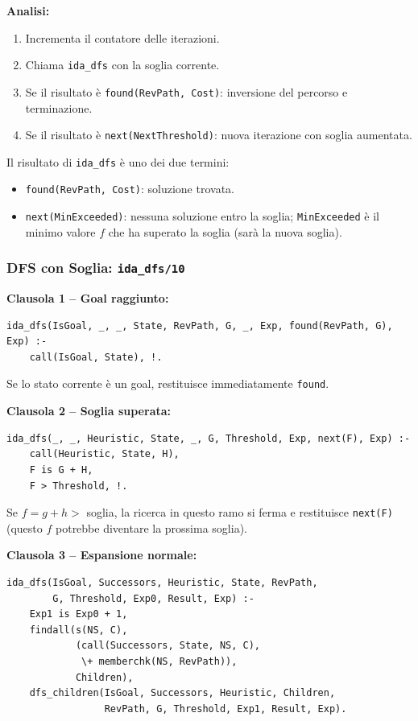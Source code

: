 \documentclass[12pt,a4paper]{article}
\begin{document}
\noindent\textbf{Analisi:}
\begin{enumerate}
  \item Incrementa il contatore delle iterazioni.
  \item Chiama \texttt{ida\_dfs} con la soglia corrente.
  \item Se il risultato è \texttt{found(RevPath, Cost)}: inversione del percorso e terminazione.
  \item Se il risultato è \texttt{next(NextThreshold)}: nuova iterazione con soglia aumentata.
\end{enumerate}

\noindent Il risultato di \texttt{ida\_dfs} è uno dei due termini:
\begin{itemize}[noitemsep]
  \item \texttt{found(RevPath, Cost)}: soluzione trovata.
  \item \texttt{next(MinExceeded)}: nessuna soluzione entro la soglia; \texttt{MinExceeded}
        è il minimo valore $f$ che ha superato la soglia (sarà la nuova soglia).
\end{itemize}

\subsubsection{DFS con Soglia: \texttt{ida\_dfs/10}}

\textbf{Clausola 1 -- Goal raggiunto:}
\begin{lstlisting}
ida_dfs(IsGoal, _, _, State, RevPath, G, _, Exp, found(RevPath, G), Exp) :-
    call(IsGoal, State), !.
\end{lstlisting}
Se lo stato corrente è un goal, restituisce immediatamente \texttt{found}.

\textbf{Clausola 2 -- Soglia superata:}
\begin{lstlisting}
ida_dfs(_, _, Heuristic, State, _, G, Threshold, Exp, next(F), Exp) :-
    call(Heuristic, State, H),
    F is G + H,
    F > Threshold, !.
\end{lstlisting}
Se $f = g + h >$ soglia, la ricerca in questo ramo si ferma e restituisce
\texttt{next(F)} (questo $f$ potrebbe diventare la prossima soglia).

\textbf{Clausola 3 -- Espansione normale:}
\begin{lstlisting}
ida_dfs(IsGoal, Successors, Heuristic, State, RevPath,
        G, Threshold, Exp0, Result, Exp) :-
    Exp1 is Exp0 + 1,
    findall(s(NS, C),
            (call(Successors, State, NS, C),
             \+ memberchk(NS, RevPath)),
            Children),
    dfs_children(IsGoal, Successors, Heuristic, Children,
                 RevPath, G, Threshold, Exp1, Result, Exp).
\end{lstlisting}
\end{document}
